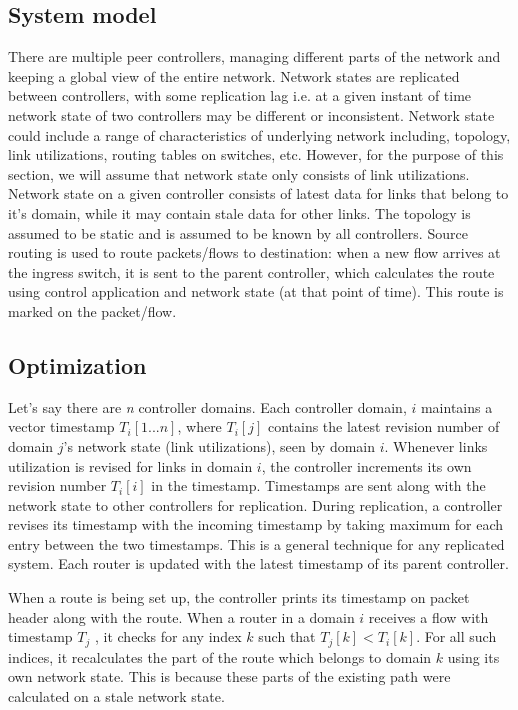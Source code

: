 \documentclass[10pt, twocolumn]{article}
\begin{document}
\subsection{System model}
There are multiple peer controllers, managing different parts of the network and keeping a global view of the entire network. Network states are replicated between controllers, with some replication lag i.e. at a given instant of time network state of two controllers may be different or inconsistent. Network state could include a range of characteristics of underlying network including, topology, link utilizations, routing tables on switches, etc. However, for the purpose of this section, we will assume that network state only consists of link utilizations. Network state on a given controller consists of latest data for links that belong to it's domain, while it may contain stale data for other links. The topology is assumed to be static and is assumed to be known by all controllers. Source routing is used to route packets/flows to destination: when a new flow arrives at the ingress switch, it is sent to the parent controller, which calculates the route using control application and network state (at that point of time). This route is marked on the packet/flow.
  
\subsection{Optimization}
Let's say there are \emph{n} controller domains. Each controller domain, $i$ maintains a vector timestamp $T_{i}[1...n]$, where $T_{i}[j]$ contains the latest revision number of domain $j$'s network state (link utilizations), seen by domain $i$. Whenever links utilization is revised for links in domain $i$, the controller increments its own revision number $T_{i}[i]$ in the timestamp. Timestamps are sent along with the network state to other controllers for replication. During replication, a controller revises its timestamp with the incoming timestamp by taking maximum for each entry between the two timestamps. This is a general technique for any replicated system. Each router is updated with the latest timestamp of its parent controller. 

When a route is being set up, the controller prints its timestamp on packet header along with the route. When a router in a domain $i$ receives a flow with timestamp $T_{j}$ , it checks for any index $k$ such that $T_{j} [k] < T_{i} [k]$. For all such indices, it recalculates the part of the route which belongs to domain $k$ using its own network state. This is because these parts of the existing path were calculated on a stale network state.
  
\end{document}
